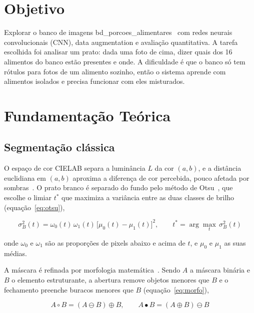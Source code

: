 \documentclass[11pt]{article}
\date{11.2026}
\begin{document}
\maketitle

\section{Objetivo}

Explorar o banco de imagens bd\_porcoes\_alimentares~\cite{shiga} com redes neurais convolucionais (CNN), data augmentation e avaliação quantitativa. A tarefa escolhida foi analisar um prato: dada uma foto de cima, dizer quais dos 16 alimentos do banco estão presentes e onde. A dificuldade é que o banco só tem rótulos para fotos de um alimento sozinho, então o sistema aprende com alimentos isolados e precisa funcionar com eles misturados.

\section{Fundamentação Teórica}

\subsection{Segmentação clássica}

O espaço de cor CIELAB separa a luminância $L$ da cor $(a, b)$, e a distância euclidiana em $(a, b)$ aproxima a diferença de cor percebida, pouco afetada por sombras~\cite{gonzalez:18}. O prato branco é separado do fundo pelo método de Otsu~\cite{otsu:79}, que escolhe o limiar $t^*$ que maximiza a variância entre as duas classes de brilho (equação~\ref{eq:otsu}),

\begin{equation} \label{eq:otsu}
\sigma_B^2(t) = \omega_0(t)\,\omega_1(t)\,\big[\mu_0(t) - \mu_1(t)\big]^2, \qquad t^* = \arg\max_t \, \sigma_B^2(t)
\end{equation}

\noindent onde $\omega_0$ e $\omega_1$ são as proporções de pixels abaixo e acima de $t$, e $\mu_0$ e $\mu_1$ as suas médias.

A máscara é refinada por morfologia matemática~\cite{gonzalez:18}. Sendo $A$ a máscara binária e $B$ o elemento estruturante, a abertura remove objetos menores que $B$ e o fechamento preenche buracos menores que $B$ (equação~\ref{eq:morfo}),

\begin{equation} \label{eq:morfo}
A \circ B = (A \ominus B) \oplus B, \qquad A \bullet B = (A \oplus B) \ominus B
\end{equation}
\end{document}
